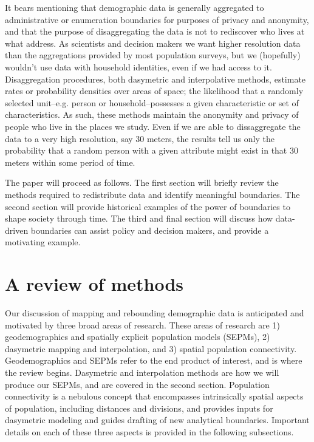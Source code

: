 \documentclass[draft]{article}
\begin{document}

It bears mentioning that demographic data is generally aggregated to administrative or enumeration boundaries for purposes of privacy and anonymity, and that the purpose of disaggregating the data is not to rediscover who lives at what address.  As scientists and decision makers we want higher resolution data than the aggregations provided by most population surveys, but we (hopefully) wouldn't use data with household identities, even if we had access to it.  Disaggregation procedures, both dasymetric and interpolative methods, estimate rates or probability densities over areas of space; the likelihood that a randomly selected unit--e.g. person or household--possesses a given characteristic or set of characteristics.  As such, these methods maintain the anonymity and privacy of people who live in the places we study.  Even if we are able to dissaggregate the data to a very high resolution, say 30 meters, the results tell us only the probability that a random person with a given attribute might exist in that 30 meters within some period of time.


The paper will proceed as follows.  The first section will briefly review the methods required to redistribute data and identify meaningful boundaries.  The second section will provide historical examples of the power of boundaries to shape society through time.  The third and final section will discuss how data-driven boundaries can assist policy and decision makers, and provide a motivating example.


\section{A review of methods}

Our discussion of mapping and rebounding demographic data is anticipated and motivated by three broad areas of research.  %
These areas of research are 1) geodemographics and spatially explicit population models (SEPMs), 2) dasymetric mapping and interpolation, and 3) spatial population connectivity.  Geodemographics and SEPMs refer to the end product of interest, and is where the review begins.  Dasymetric and interpolation methods are how we will produce our SEPMs, and are covered in the second section.  Population connectivity is a nebulous concept that encompasses intrinsically spatial aspects of population, including distances and divisions, and provides inputs for dasymetric modeling and guides drafting of new analytical boundaries.  Important details on each of these three aspects is provided in the following subsections.
\end{document}
